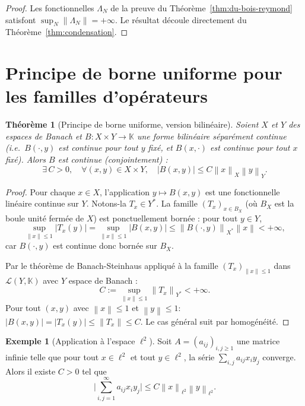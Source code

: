 \documentclass[a4paper,12pt]{book}
\newcommand{\K}{\mathbb{K}}
\newcommand{\norm}[1]{\left\| #1 \right\|}
\newcommand{\abs}[1]{\left| #1 \right|}
\theoremstyle{definition}
\newtheorem{exemple}[definition]{Exemple}
\theoremstyle{plain}
\newtheorem{theoreme}[definition]{Théorème}
\theoremstyle{remark}
\begin{document}
\begin{proof}
Les fonctionnelles $\Lambda_N$ de la preuve du Théorème~\ref{thm:du-bois-reymond}
satisfont $\sup_N \norm{\Lambda_N} = +\infty$. Le résultat découle directement
du Théorème~\ref{thm:condensation}.
\end{proof}


\section{Principe de borne uniforme pour les familles d'opérateurs}
\label{sec:PBU-familles}


\begin{theoreme}[Principe de borne uniforme, version bilinéaire]
\label{thm:PBU-bilineaire}
Soient $X$ et $Y$ des espaces de Banach et $B : X \times Y \to \K$
une forme bilinéaire séparément continue
(i.e.\ $B(\cdot, y)$ est continue pour tout $y$ fixé, et $B(x, \cdot)$
est continue pour tout $x$ fixé). Alors $B$ est continue (conjointement) :
\[
  \exists\, C > 0, \quad \forall (x,y) \in X \times Y, \quad
  \abs{B(x,y)} \leq C \norm{x}_X \norm{y}_Y.
\]
\end{theoreme}

\begin{proof}
Pour chaque $x \in X$, l'application $y \mapsto B(x,y)$ est une fonctionnelle
linéaire continue sur $Y$. Notons-la $T_x \in Y^*$. La famille $(T_x)_{x \in B_X}$
(où $B_X$ est la boule unité fermée de $X$) est ponctuellement bornée :
pour tout $y \in Y$,
\[
  \sup_{\norm{x} \leq 1} \abs{T_x(y)} = \sup_{\norm{x} \leq 1} \abs{B(x,y)}
  \leq \norm{B(\cdot, y)}_{X^*} \norm{x} < +\infty,
\]
car $B(\cdot, y)$ est continue donc bornée sur $B_X$.

Par le théorème de Banach-Steinhaus appliqué à la famille $(T_x)_{\norm{x} \leq 1}$
dans $\mathcal{L}(Y, \K)$ avec $Y$ espace de Banach :
\[
  C := \sup_{\norm{x} \leq 1} \norm{T_x}_{Y^*} < +\infty.
\]
Pour tout $(x,y)$ avec $\norm{x} \leq 1$ et $\norm{y} \leq 1$:
$\abs{B(x,y)} = \abs{T_x(y)} \leq \norm{T_x} \leq C$.
Le cas général suit par homogénéité.
\end{proof}

\begin{exemple}[Application à l'espace $\ell^2$]
\label{ex:bilinear-l2}
Soit $A = (a_{ij})_{i,j \geq 1}$ une matrice infinie telle que pour
tout $x \in \ell^2$ et tout $y \in \ell^2$, la série
$\sum_{i,j} a_{ij} x_i y_j$ converge. Alors il existe $C > 0$ tel que
\[
  \biggl\lvert \sum_{i,j=1}^{\infty} a_{ij} x_i y_j \biggr\rvert
  \leq C \norm{x}_{\ell^2} \norm{y}_{\ell^2}.
\]
\end{exemple}
\end{document}
